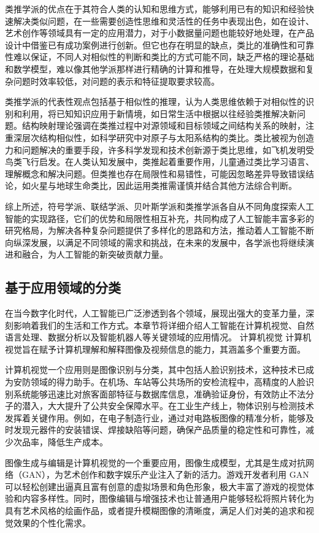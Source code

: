 类推学派的优点在于其符合人类的认知和思维方式，能够利用已有的知识和经验快速解决类似问题，在一些需要创造性思维和灵活性的任务中表现出色，如在设计、艺术创作等领域具有一定的应用潜力，对于小数据量问题也能较好地处理，在产品设计中借鉴已有成功案例进行创新。但它也存在明显的缺点，类比的准确性和可靠性难以保证，不同人对相似性的判断和类比的方式可能不同，缺乏严格的理论基础和数学模型，难以像其他学派那样进行精确的计算和推导，在处理大规模数据和复杂问题时效率较低，对问题的表示和特征提取要求较高。


类推学派的代表性观点包括基于相似性的推理，认为人类思维依赖于对相似性的识别和利用，将已知知识应用于新情境，如日常生活中根据以往经验类推解决新问题。结构映射理论强调在类推过程中对源领域和目标领域之间结构关系的映射，注重深层次结构相似性，如科学研究中对原子与太阳系结构的类比。类比被视为创造力和问题解决的重要手段，许多科学发现和技术创新源于类比思维，如飞机发明受鸟类飞行启发。在人类认知发展中，类推起着重要作用，儿童通过类比学习语言、理解概念和解决问题。但类推也存在局限性和易错性，可能因忽略差异导致错误结论，如火星与地球生命类比，因此运用类推需谨慎并结合其他方法综合判断。


综上所述，符号学派、联结学派、贝叶斯学派和类推学派各自从不同角度探索人工智能的实现路径，它们的优势和局限性相互补充，共同构成了人工智能丰富多彩的研究格局，为解决各种复杂问题提供了多样化的思路和方法，推动着人工智能不断向纵深发展，以满足不同领域的需求和挑战，在未来的发展中，各学派也将继续演进和融合，为人工智能的新突破贡献力量。

\subsection{基于应用领域的分类}
在当今数字化时代，人工智能已广泛渗透到各个领域，展现出强大的变革力量，深刻影响着我们的生活和工作方式。本章节将详细介绍人工智能在计算机视觉、自然语言处理、数据分析以及智能机器人等关键领域的应用情况。
计算机视觉
计算机视觉旨在赋予计算机理解和解释图像及视频信息的能力，其涵盖多个重要方面。


计算机视觉一个应用则是图像识别与分类，其中包括人脸识别技术，这种技术已成为安防领域的得力助手。在机场、车站等公共场所的安检流程中，高精度的人脸识别系统能够迅速比对旅客面部特征与数据库信息，准确验证身份，有效防止不法分子的潜入，大大提升了公共安全保障水平。在工业生产线上，物体识别与检测技术发挥着关键作用。例如，在电子制造行业，通过对电路板图像的精准分析，能够及时发现元器件的安装错误、焊接缺陷等问题，确保产品质量的稳定性和可靠性，减少次品率，降低生产成本。


图像生成与编辑是计算机视觉的一个重要应用，图像生成模型，尤其是生成对抗网络（GAN），为艺术创作和数字娱乐产业注入了新的活力。游戏开发者利用 GAN 可以轻松创建出逼真且富有创意的虚拟场景和角色形象，极大丰富了游戏的视觉体验和内容多样性。同时，图像编辑与增强技术也让普通用户能够轻松将照片转化为具有艺术风格的绘画作品，或者提升模糊图像的清晰度，满足人们对美的追求和视觉效果的个性化需求。


